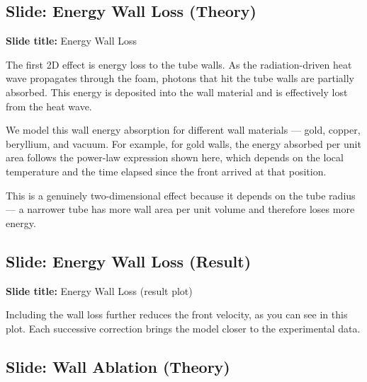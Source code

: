 \documentclass[12pt, a4paper]{article}
\begin{document}
\subsection{Slide: Energy Wall Loss (Theory)}

\begin{slidebox}
\textbf{Slide title:} Energy Wall Loss
\end{slidebox}

The first 2D effect is energy loss to the tube walls. As the radiation-driven heat wave propagates through the foam, photons that hit the tube walls are partially absorbed. This energy is deposited into the wall material and is effectively lost from the heat wave.

We model this wall energy absorption for different wall materials --- gold, copper, beryllium, and vacuum. For example, for gold walls, the energy absorbed per unit area follows the power-law expression shown here, which depends on the local temperature and the time elapsed since the front arrived at that position.

This is a genuinely two-dimensional effect because it depends on the tube radius --- a narrower tube has more wall area per unit volume and therefore loses more energy.

\subsection{Slide: Energy Wall Loss (Result)}

\begin{slidebox}
\textbf{Slide title:} Energy Wall Loss (result plot)
\end{slidebox}

Including the wall loss further reduces the front velocity, as you can see in this plot. Each successive correction brings the model closer to the experimental data.

\subsection{Slide: Wall Ablation (Theory)}
\end{document}
